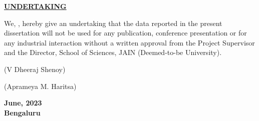 
\thispagestyle{empty}

\begin{center}
    
\Large{\underline{\textbf{UNDERTAKING}}}\\


\end{center}

\vspace{1.5cm}

\noindent
We, \textbf{\authone{}}, \textbf{\authtwo{}} hereby give an undertaking that the data
reported in the present dissertation will not be used for any publication, conference
presentation or for any industrial interaction without a written approval from the Project
Supervisor and the Director, School of Sciences, JAIN (Deemed-to-be University).

\vspace{5cm}

\noindent
\begin{minipage}{0.5\textwidth}

(V Dheeraj Shenoy)

\vspace{1.5cm}

(Aprameya M. Haritsa)
\end{minipage}%
\begin{minipage}{0.5\textwidth}
\flushright

\textbf{June, 2023\\
Bengaluru}
\end{minipage}